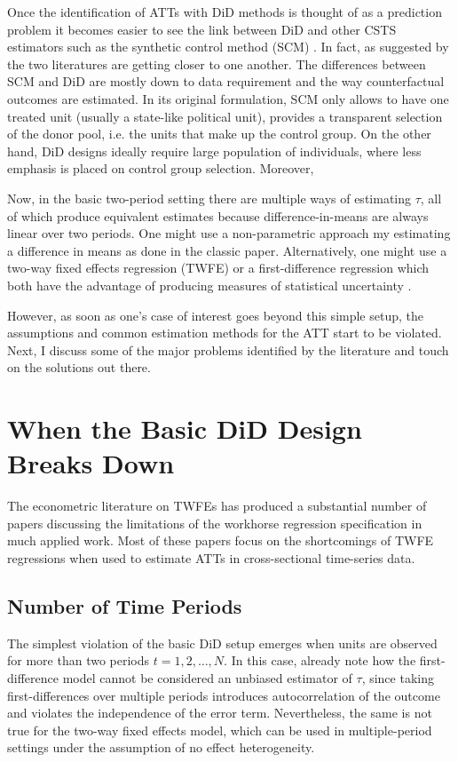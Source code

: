 \documentclass[hidelinks]{article}\usepackage[]{graphicx}\usepackage[]{color}
\begin{document}
Once the identification of ATTs with DiD methods is thought of as a prediction problem it becomes easier to see the link between DiD and other CSTS estimators such as the synthetic control method (SCM) \parencite{Abadie2010}. In fact, as suggested by \textcite{Roth2022} the two literatures are getting closer to one another. The differences between SCM and DiD are mostly down to data requirement and the way counterfactual outcomes are estimated. In its original formulation, SCM only allows to have one treated unit (usually a state-like political unit), provides a transparent selection of the donor pool, i.e. the units that make up the control group. On the other hand, DiD designs ideally require large population of individuals, where less emphasis is placed on control group selection. Moreover,

Now, in the basic two-period setting there are multiple ways of estimating $\tau$, all of which produce equivalent estimates because difference-in-means are always linear over two periods. One might use a non-parametric approach my estimating a difference in means as done in the classic \textcite{Card1990} paper. Alternatively, one might use a two-way fixed effects regression (TWFE) or a first-difference regression which both have the advantage of producing measures of statistical uncertainty \parencite{Angrist2009}.

However, as soon as one's case of interest goes beyond this simple setup, the assumptions and common estimation methods for the ATT start to be violated. Next, I discuss some of the major problems identified by the literature and touch on the solutions out there.

\section{When the Basic DiD Design Breaks Down}

The econometric literature on TWFEs has produced a substantial number of papers discussing the limitations of the workhorse regression specification in much applied work. Most of these papers focus on the shortcomings of TWFE regressions when used to estimate ATTs in cross-sectional time-series data.

\subsection{Number of Time Periods}

The simplest violation of the basic DiD setup emerges when units are observed for more than two periods $t=1, 2, \dots, N$. In this case, \textcite{Angrist2009} already note how the first-difference model cannot be considered an unbiased estimator of $\tau$, since taking first-differences over multiple periods introduces autocorrelation of the outcome and violates the independence of the error term. Nevertheless, the same is not true for the two-way fixed effects model, which can be used in multiple-period settings under the assumption of no effect heterogeneity.
\end{document}
